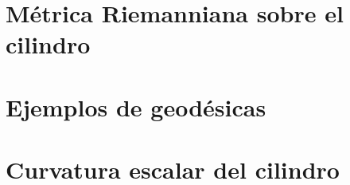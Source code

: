 \documentclass[twoside, 11pt]{article}
\theoremstyle{definition}
\begin{document}
\section{Métrica Riemanniana sobre el cilindro}




\section{Ejemplos de geodésicas}




\section{Curvatura escalar del cilindro}
\end{document}
